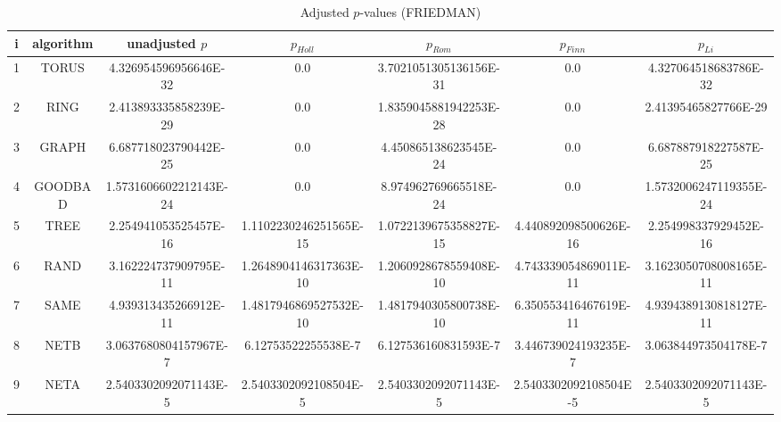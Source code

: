 \documentclass[a4paper,10pt]{article}
\begin{document}
\begin{landscape}
\begin{table}[!htp]
\centering\scriptsize
\caption{Adjusted $p$-values (FRIEDMAN)}
\begin{tabular}{ccccccc}
i&algorithm&unadjusted $p$&$p_{Holl}$&$p_{Rom}$&$p_{Finn}$&$p_{Li}$\\
\hline
1& TORUS&4.326954596956646E-32&0.0&3.7021051305136156E-31&0.0&4.327064518683786E-32\\
2& RING&2.413893335858239E-29&0.0&1.8359045881942253E-28&0.0&2.41395465827766E-29\\
3& GRAPH&6.687718023790442E-25&0.0&4.450865138623545E-24&0.0&6.687887918227587E-25\\
4& GOODBAD&1.5731606602212143E-24&0.0&8.974962769665518E-24&0.0&1.5732006247119355E-24\\
5& TREE&2.254941053525457E-16&1.1102230246251565E-15&1.0722139675358827E-15&4.440892098500626E-16&2.254998337929452E-16\\
6& RAND&3.162224737909795E-11&1.2648904146317363E-10&1.2060928678559408E-10&4.743339054869011E-11&3.1623050708008165E-11\\
7& SAME&4.939313435266912E-11&1.4817946869527532E-10&1.4817940305800738E-10&6.350553416467619E-11&4.9394389130818127E-11\\
8& NETB&3.0637680804157967E-7&6.12753522255538E-7&6.127536160831593E-7&3.446739024193235E-7&3.063844973504178E-7\\
9& NETA&2.5403302092071143E-5&2.5403302092108504E-5&2.5403302092071143E-5&2.5403302092108504E-5&2.5403302092071143E-5\\
\hline
\end{tabular}
\end{table}


\newpage


\end{landscape}
\end{document}
